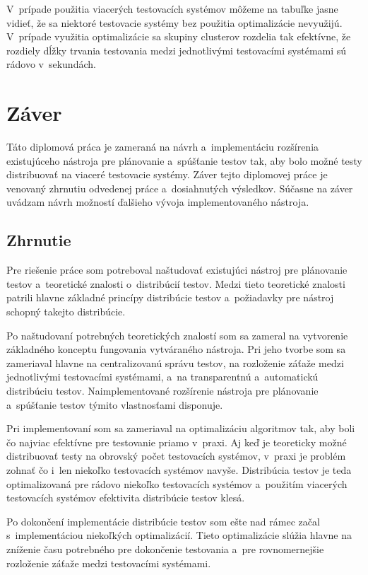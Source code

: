 V~prípade použitia viacerých testovacích systémov môžeme na tabuľke jasne vidieť,
že sa niektoré testovacie systémy bez použitia optimalizácie nevyužijú. 
V~prípade využitia optimalizácie sa skupiny clusterov rozdelia tak efektívne,
že rozdiely dĺžky trvania testovania medzi jednotlivými testovacími systémami 
sú rádovo v~sekundách.


%
%
\chapter{Záver}
\label{kapitola:zaver}
Táto diplomová práca je zameraná na návrh a~implementáciu rozšírenia
existujúceho nástroja pre plánovanie a~spúšťanie testov tak, aby bolo
možné testy distribuovať na viaceré testovacie systémy. 
Záver tejto diplomovej práce je venovaný zhrnutiu odvedenej práce 
a~dosiahnutých výsledkov. Súčasne na záver uvádzam návrh možností ďalšieho
vývoja implementovaného nástroja.

\section{Zhrnutie}
\label{sekcia:zhrnutie}
Pre riešenie práce som potreboval naštudovať existujúci nástroj pre 
plánovanie testov a~teoretické znalosti o~distribúcií testov.
Medzi tieto teoretické znalosti patrili hlavne základné princípy 
distribúcie testov a~požiadavky pre nástroj schopný takejto distribúcie.

Po naštudovaní potrebných teoretických znalostí som sa zameral na vytvorenie
základného konceptu fungovania vytváraného nástroja. Pri jeho tvorbe
som sa zameriaval hlavne na centralizovanú správu testov, na rozloženie 
záťaže medzi jednotlivými testovacími systémami, a~na transparentnú
a~automatickú distribúciu testov. Naimplementované rozšírenie nástroja pre
plánovanie a~spúšťanie testov týmito vlastnosťami disponuje.

Pri implementovaní som sa zameriaval na optimalizáciu algoritmov tak, aby
boli čo najviac efektívne pre testovanie priamo v~praxi. 
Aj keď je teoreticky možné distribuovať testy na obrovský počet
testovacích systémov, v~praxi je problém zohnať čo i~len niekoľko testovacích
systémov navyše. 
Distribúcia testov je teda optimalizovaná pre rádovo niekoľko testovacích 
systémov a~použitím viacerých testovacích systémov efektivita distribúcie
testov klesá. 

Po dokončení implementácie distribúcie testov som ešte nad rámec začal 
s~implementáciou niekoľkých optimalizácií. Tieto optimalizácie slúžia hlavne
na zníženie času potrebného pre dokončenie testovania a~pre rovnomernejšie
rozloženie záťaže medzi testovacími systémami. 

